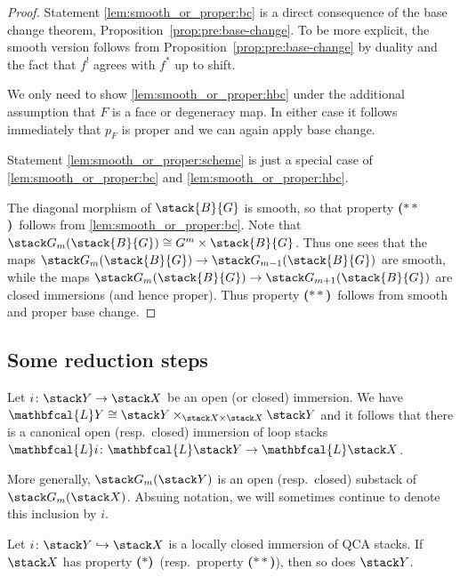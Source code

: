\documentclass{ck-article}
\newcommand\bc{\textbf{($\mathbf{*}$)}}
\newcommand\hbc{\textbf{($\mathbf{**}$)}}
\newcommand\cs{\stack{B}}
\renewcommand\ls[1]{\mathbfcal{L} #1}
\begin{document}
\begin{proof}
    Statement \ref{lem:smooth_or_proper:bc} is a direct consequence of the base change theorem, Proposition~\ref{prop:pre:base-change}.
    To be more explicit, the smooth version follows from Proposition~\ref{prop:pre:base-change} by duality and the fact that $f^!$ agrees with $f^*$ up to shift.

    We only need to show \ref{lem:smooth_or_proper:hbc} under the additional assumption that $F$ is a face or degeneracy map.
    In either case it follows immediately that $p_{F}$ is proper and we can again apply base change.

    Statement \ref{lem:smooth_or_proper:scheme} is just a special case of \ref{lem:smooth_or_proper:bc} and \ref{lem:smooth_or_proper:hbc}.
    
    The diagonal morphism of $\cs{G}$ is smooth, so that property \hbc\ follows from \ref{lem:smooth_or_proper:bc}.
    Note that $\stack G_m(\cs{G}) \cong G^m \times \cs{G}$.
    Thus one sees that the maps $\stack G_m(\cs{G}) \to \stack G_{m-1}(\cs{G})$ are smooth, while the maps $\stack G_m(\cs{G}) \to \stack G_{m+1}(\cs{G})$ are closed immersions (and hence proper).
    Thus property \hbc\ follows from smooth and proper base change.
\end{proof}

\subsection{Some reduction steps}

Let $i\colon\stack Y \to \stack X$ be an open (or closed) immersion.
We have $\ls Y \cong \stack Y \times_{\stack X \times \stack X} \stack Y$ and it follows that there is a canonical open (resp.~closed) immersion of loop stacks $\ls i\colon \ls \stack Y \to \ls \stack X$.

More generally, $\stack G_m(\stack Y)$ is an open (resp.~closed) substack of $\stack G_m(\stack X)$.
Absuing notation, we will sometimes continue to denote this inclusion by $i$.

\begin{Lem}\label{lem:lc_immersion}
    Let $i\colon\stack Y \hookrightarrow \stack X$ is a locally closed immersion of QCA stacks.
    If $\stack X$ has property \bc\ (resp.~property \hbc), then so does $\stack Y$.
\end{Lem}
\end{document}
